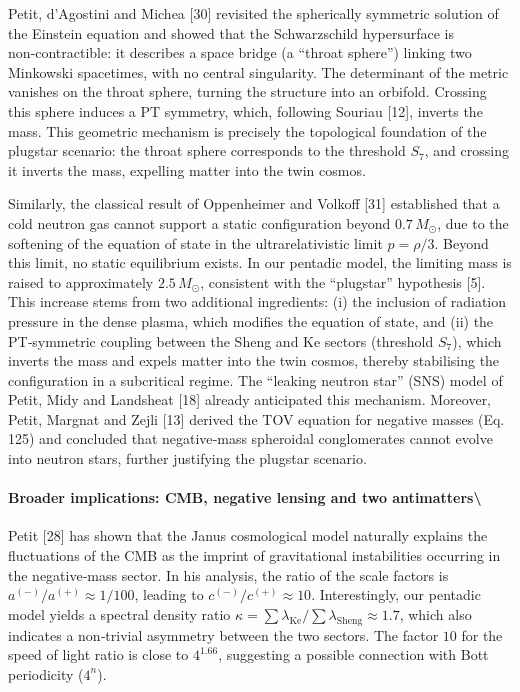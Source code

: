 \documentclass[11pt]{article}
\begin{document}
Petit, d'Agostini and Michea {[}30{]} revisited the spherically
symmetric solution of the Einstein equation and showed that the
Schwarzschild hypersurface is non‑contractible: it describes a space
bridge (a ``throat sphere'') linking two Minkowski spacetimes, with no
central singularity. The determinant of the metric vanishes on the
throat sphere, turning the structure into an orbifold. Crossing this
sphere induces a PT symmetry, which, following Souriau {[}12{]}, inverts
the mass. This geometric mechanism is precisely the topological
foundation of the plugstar scenario: the throat sphere corresponds to
the threshold \(S_7\), and crossing it inverts the mass, expelling
matter into the twin cosmos.

Similarly, the classical result of Oppenheimer and Volkoff {[}31{]}
established that a cold neutron gas cannot support a static
configuration beyond \(0.7\,M_\odot\), due to the softening of the
equation of state in the ultrarelativistic limit \(p = \rho/3\). Beyond
this limit, no static equilibrium exists. In our pentadic model, the
limiting mass is raised to approximately \(2.5\,M_\odot\), consistent
with the ``plugstar'' hypothesis {[}5{]}. This increase stems from two
additional ingredients: (i) the inclusion of radiation pressure in the
dense plasma, which modifies the equation of state, and (ii) the
PT‑symmetric coupling between the Sheng and Ke sectors (threshold
\(S_7\)), which inverts the mass and expels matter into the twin cosmos,
thereby stabilising the configuration in a subcritical regime. The
``leaking neutron star'' (SNS) model of Petit, Midy and Landsheat
{[}18{]} already anticipated this mechanism. Moreover, Petit, Margnat
and Zejli {[}13{]} derived the TOV equation for negative masses
(Eq.\,125) and concluded that negative‑mass spheroidal conglomerates
cannot evolve into neutron stars, further justifying the plugstar
scenario.

\hypertarget{broader-implications-cmb-negative-lensing-and-two-antimatters}{%
\paragraph{Broader implications: CMB, negative lensing and two
antimatters\textbackslash{}}\label{broader-implications-cmb-negative-lensing-and-two-antimatters}}

Petit {[}28{]} has shown that the Janus cosmological model naturally
explains the fluctuations of the CMB as the imprint of gravitational
instabilities occurring in the negative‑mass sector. In his analysis,
the ratio of the scale factors is \(a^{(-)}/a^{(+)} \approx 1/100\),
leading to \(c^{(-)}/c^{(+)} \approx 10\). Interestingly, our pentadic
model yields a spectral density ratio
\(\kappa = \sum \lambda_{\text{Ke}} / \sum \lambda_{\text{Sheng}} \approx 1.7\),
which also indicates a non‑trivial asymmetry between the two sectors.
The factor \(10\) for the speed of light ratio is close to \(4^{1.66}\),
suggesting a possible connection with Bott periodicity (\(4^{n}\)).
\end{document}

